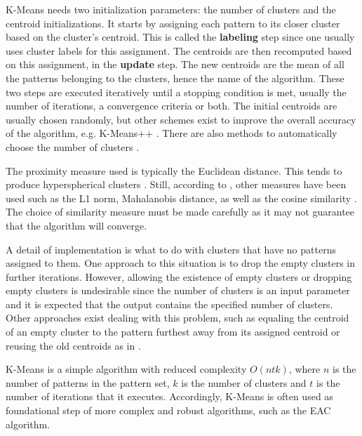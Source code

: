 K-Means needs two initialization parameters: the number of clusters and the centroid initializations.
It starts by assigning each pattern to its closer cluster based on the cluster's centroid.
This is called the \textbf{labeling} step since one usually uses cluster labels for this assignment.
The centroids are then recomputed based on this assignment, in the \textbf{update} step.
The new centroids are the mean of all the patterns belonging to the clusters, hence the name of the algorithm.
These two steps are executed iteratively until a stopping condition is met, usually the number of iterations, a convergence criteria or both.
The initial centroids are usually chosen randomly, but other schemes exist to improve the overall accuracy of the algorithm, e.g. K-Means++ \cite{Arthur2007}.
There are also methods to automatically choose the number of clusters \cite{Aggarwal2014}.

The proximity measure used is typically the Euclidean distance.
This tends to produce hyperspherical clusters \cite{Jain1999}.
Still, according to \cite{Jain2010}, other measures have been used such as the L1 norm, Mahalanobis distance, as well as the cosine similarity \cite{Aggarwal2014}.
The choice of similarity measure must be made carefully as it may not guarantee that the algorithm will converge.

A detail of implementation is what to do with clusters that have no patterns assigned to them.
One approach to this situation is to drop the empty clusters in further iterations.
However, allowing the existence of empty clusters or dropping empty clusters is undesirable since the number of clusters is an input parameter and it is expected that the output contains the specified number of clusters.
Other approaches exist dealing with this problem, such as equaling the centroid of an empty cluster to the pattern furthest away from its assigned centroid or reusing the old centroids as in \cite{Pakhira2009}.

K-Means is a simple algorithm with reduced complexity $O(ntk)$, where $n$ is the number of patterns in the pattern set, $k$ is the number of clusters and $t$ is the number of iterations that it executes.
Accordingly, K-Means is often used as foundational step of more complex and robust algorithms, such as the EAC algorithm.


